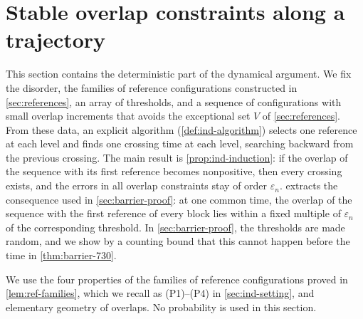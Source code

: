 \chapter{Stable overlap constraints along a trajectory}\label{sec:induction}

This section contains the deterministic part of the dynamical argument. We fix the disorder, the families of reference configurations constructed in \cref{sec:references}, an array of thresholds, and a sequence of configurations with small overlap increments that avoids the exceptional set $V$ of \cref{sec:references}. From these data, an explicit algorithm (\cref{def:ind-algorithm}) selects one reference at each level and finds one crossing time at each level, searching backward from the previous crossing. The main result is \cref{prop:ind-induction}: if the overlap of the sequence with its first reference becomes nonpositive, then every crossing exists, and the errors in all overlap constraints stay of order $\varepsilon_n$.  extracts the consequence used in \cref{sec:barrier-proof}: at one common time, the overlap of the sequence with the first reference of every block lies within a fixed multiple of $\varepsilon_n$ of the corresponding threshold. In \cref{sec:barrier-proof}, the thresholds are made random, and we show by a counting bound that this cannot happen before the time in \cref{thm:barrier-730}.

We use the four properties of the families of reference configurations proved in \cref{lem:ref-families}, which we recall as (P1)--(P4) in \cref{sec:ind-setting}, and elementary geometry of overlaps. No probability is used in this section.

